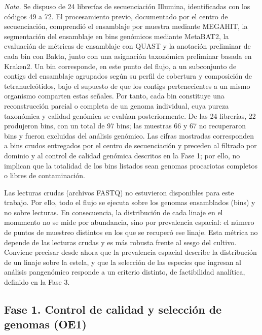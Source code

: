 \begin{table}[htbp]
\vspace{0.5em}

\begin{minipage}{0.95\textwidth}
\footnotesize
\textit{Nota.} Se dispuso de 24 librerías de secuenciación Illumina, identificadas con los códigos 49 a 72. El procesamiento previo, documentado por el centro de secuenciación, comprendió el ensamblaje por muestra mediante MEGAHIT, la segmentación del ensamblaje en bins genómicos mediante MetaBAT2, la evaluación de métricas de ensamblaje con QUAST y la anotación preliminar de cada bin con Bakta, junto con una asignación taxonómica preliminar basada en Kraken2. Un bin corresponde, en este punto del flujo, a un subconjunto de contigs del ensamblaje agrupados según su perfil de cobertura y composición de tetranucleótidos, bajo el supuesto de que los contigs pertenecientes a un mismo organismo comparten estas señales. Por tanto, cada bin constituye una reconstrucción parcial o completa de un genoma individual, cuya pureza taxonómica y calidad genómica se evalúan posteriormente. De las 24 librerías, 22 produjeron bins, con un total de 97 bins; las muestras 66 y 67 no recuperaron bins y fueron excluidas del análisis genómico. Las cifras mostradas corresponden a bins crudos entregados por el centro de secuenciación y preceden al filtrado por dominio y al control de calidad genómica descritos en la Fase 1; por ello, no implican que la totalidad de los bins listados sean genomas procariotas completos o libres de contaminación.
\end{minipage}

\end{table}
Las lecturas crudas (archivos FASTQ) no estuvieron disponibles para este
trabajo. Por ello, todo el flujo se ejecuta sobre los genomas ensamblados
(bins) y no sobre lecturas. En consecuencia, la distribución de cada linaje en
el monumento no se mide por abundancia, sino por prevalencia espacial: el
número de puntos de muestreo distintos en los que se recuperó ese linaje. Esta
métrica no depende de las lecturas crudas y es más robusta frente al sesgo del
cultivo. Conviene precisar desde ahora que la prevalencia espacial describe la
distribución de un linaje sobre la estela, y que la selección de las especies
que ingresan al análisis pangenómico responde a un criterio distinto, de
factibilidad analítica, definido en la Fase 3.


\subsection{Fase 1. Control de calidad y selección de genomas (OE1)}

